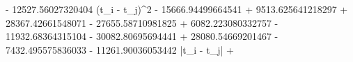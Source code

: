 - 12527.56027320404 \left(t_{i} - t_{j}\right)^{2} - 15666.94499664541  + 9513.625641218297  + 28367.42661548071  - 27655.58710981825  + 6082.223080332757  - 11932.68364315104  - 30082.80695694441  + 28080.54669201467  - 7432.495575836033  - 11261.90036053442 \left|{t_{i} - t_{j}}\right| + 
